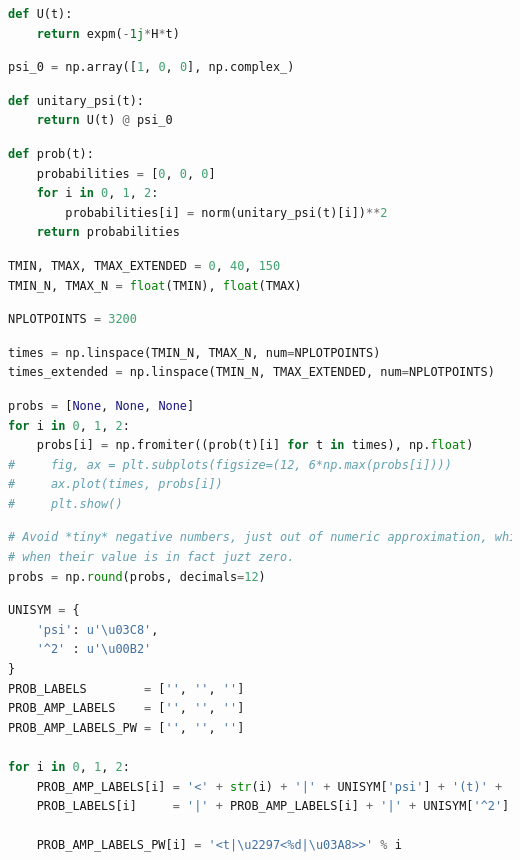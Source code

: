 \begin{lstlisting}[language=Python]
def U(t):
    return expm(-1j*H*t)
\end{lstlisting}

\begin{lstlisting}[language=Python]
psi_0 = np.array([1, 0, 0], np.complex_)
\end{lstlisting}

\begin{lstlisting}[language=Python]
def unitary_psi(t):
    return U(t) @ psi_0
\end{lstlisting}

\begin{lstlisting}[language=Python]
def prob(t):
    probabilities = [0, 0, 0]
    for i in 0, 1, 2:
        probabilities[i] = norm(unitary_psi(t)[i])**2
    return probabilities
\end{lstlisting}

\begin{lstlisting}[language=Python]
TMIN, TMAX, TMAX_EXTENDED = 0, 40, 150
TMIN_N, TMAX_N = float(TMIN), float(TMAX)
\end{lstlisting}

\begin{lstlisting}[language=Python]
NPLOTPOINTS = 3200
\end{lstlisting}

\begin{lstlisting}[language=Python]
times = np.linspace(TMIN_N, TMAX_N, num=NPLOTPOINTS)
times_extended = np.linspace(TMIN_N, TMAX_EXTENDED, num=NPLOTPOINTS)
\end{lstlisting}

\begin{lstlisting}[language=Python]
probs = [None, None, None]
for i in 0, 1, 2:
    probs[i] = np.fromiter((prob(t)[i] for t in times), np.float)
#     fig, ax = plt.subplots(figsize=(12, 6*np.max(probs[i])))
#     ax.plot(times, probs[i])
#     plt.show()
\end{lstlisting}

\begin{lstlisting}[language=Python]
# Avoid *tiny* negative numbers, just out of numeric approximation, which will cause problems later,
# when their value is in fact juzt zero.
probs = np.round(probs, decimals=12)
\end{lstlisting}

\begin{lstlisting}[language=Python]
UNISYM = {
    'psi': u'\u03C8',
    '^2' : u'\u00B2'
}
PROB_LABELS        = ['', '', '']
PROB_AMP_LABELS    = ['', '', '']
PROB_AMP_LABELS_PW = ['', '', '']
                
for i in 0, 1, 2:
    PROB_AMP_LABELS[i] = '<' + str(i) + '|' + UNISYM['psi'] + '(t)' + '>'
    PROB_LABELS[i]     = '|' + PROB_AMP_LABELS[i] + '|' + UNISYM['^2']
    
    PROB_AMP_LABELS_PW[i] = '<t|\u2297<%d|\u03A8>>' % i
\end{lstlisting}

